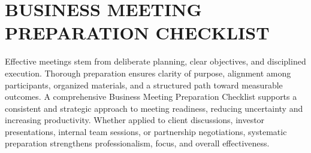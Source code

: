 
\section*{\centering BUSINESS MEETING PREPARATION CHECKLIST}
\vspace*{0.5cm}

Effective meetings stem from deliberate planning, clear objectives, and disciplined execution. Thorough preparation ensures clarity of purpose, alignment among participants, organized materials, and a structured path toward measurable outcomes. A comprehensive Business Meeting Preparation Checklist supports a consistent and strategic approach to meeting readiness, reducing uncertainty and increasing productivity. Whether applied to client discussions, investor presentations, internal team sessions, or partnership negotiations, systematic preparation strengthens professionalism, focus, and overall effectiveness.

